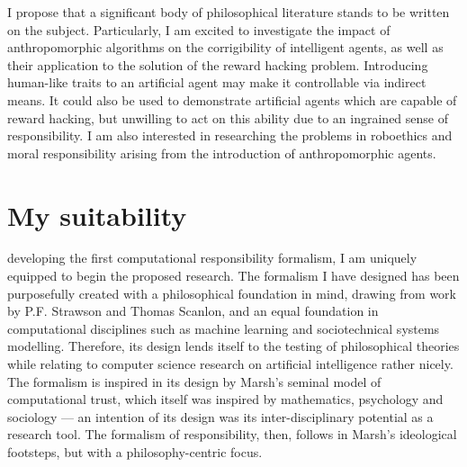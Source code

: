 I propose that a significant body of philosophical literature stands to be written on the subject. Particularly, I am excited to investigate the impact of anthropomorphic algorithms on the corrigibility of intelligent agents, as well as their application to the solution of the reward hacking problem. Introducing human-like traits to an artificial agent may make it controllable via indirect means. It could also be used to demonstrate artificial agents which are capable of reward hacking, but unwilling to act on this ability due to an ingrained sense of responsibility. I am also interested in researching the problems in roboethics and moral responsibility arising from the introduction of anthropomorphic agents.\par

\section{My suitability}

 developing the first computational responsibility formalism, I am uniquely equipped to begin the proposed research. The formalism I have designed has been purposefully created with a philosophical foundation in mind, drawing from work by P.F. Strawson\cite{freedomandresentment} and Thomas Scanlon\cite{scanlon2006justice}, and an equal foundation in computational disciplines such as machine learning and sociotechnical systems modelling\cite{sommerville_resp_depend}. Therefore, its design lends itself to the testing of philosophical theories while relating to computer science research on artificial intelligence rather nicely. The formalism is inspired in its design by Marsh's seminal model of computational trust\cite{marsh1994}, which itself was inspired by mathematics, psychology and sociology --- an intention of its design was its inter-disciplinary potential as a research tool. The formalism of responsibility, then, follows in Marsh's ideological footsteps, but with a philosophy-centric focus.\par


